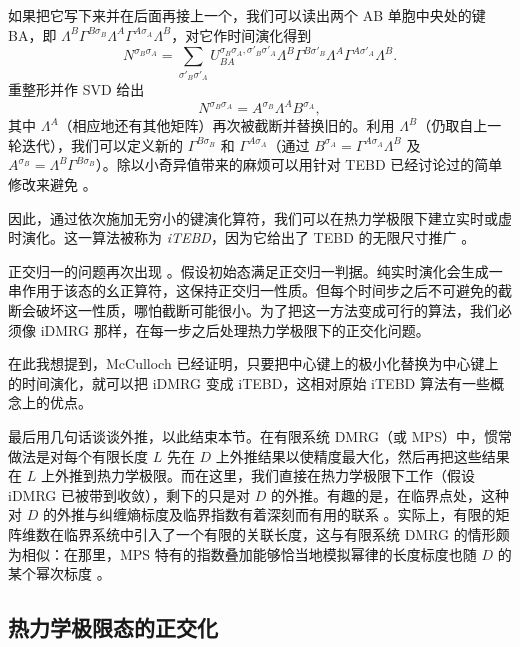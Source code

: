 如果把它写下来并在后面再接上一个，我们可以读出两个 AB 单胞中央处的键 BA，即
$ \Lambda^B \Gamma^{B \sigma_{B}} \Lambda^A \Gamma^{A \sigma_{A}} \Lambda^B$，对它作时间演化得到
\begin{equation}
N^{\sigma_{B}\sigma_{A}} = \sum_{\sigma'_{B}\sigma'_{A}} U_{BA}^ {\sigma_{B}\sigma_{A}, \sigma'_{B}\sigma'_{A}}  \Lambda^B \Gamma^{B \sigma'_{B}} \Lambda^A \Gamma^{A \sigma'_{A}} \Lambda^B .
\end{equation}
重整形并作 SVD 给出
\begin{equation}
N^{\sigma_{B}\sigma_{A}}=A^{\sigma_{B}} \Lambda^A B^{\sigma_{A}} ,
\end{equation}
其中 $\Lambda^A$（相应地还有其他矩阵）再次被截断并替换旧的。利用 $\Lambda^B$（仍取自上一轮迭代），我们可以定义新的 $\Gamma^{B \sigma_{B}}$ 和 $\Gamma^{A \sigma_{A}} $（通过 $B^{\sigma_{A}} =   \Gamma^{A \sigma_{A}} \Lambda^B$ 及 $A^{\sigma_{B}} =\Lambda^B \Gamma^{B \sigma_{B}}$）。除以小奇异值带来的麻烦可以用针对 TEBD 已经讨论过的简单修改来避免 \cite{Hastings09}。

因此，通过依次施加无穷小的键演化算符，我们可以在热力学极限下建立实时或虚时演化。这一算法被称为 {\em iTEBD}，因为它给出了 TEBD 的无限尺寸推广 \cite{Vidal07}。

正交归一的问题再次出现 \cite{Orus08}。假设初始态满足正交归一判据。纯实时演化会生成一串作用于该态的幺正算符，这保持正交归一性质。但每个时间步之后不可避免的截断会破坏这一性质，哪怕截断可能很小。为了把这一方法变成可行的算法，我们必须像 iDMRG 那样，在每一步之后处理热力学极限下的正交化问题。

在此我想提到，McCulloch\cite{McCulloch08} 已经证明，只要把中心键上的极小化替换为中心键上的时间演化，就可以把 iDMRG 变成 iTEBD，这相对原始 iTEBD 算法有一些概念上的优点。

最后用几句话谈谈外推，以此结束本节。在有限系统 DMRG（或 MPS）中，惯常做法是对每个有限长度 $L$ 先在 $D$ 上外推结果以使精度最大化，然后再把这些结果在 $L$ 上外推到热力学极限。而在这里，我们直接在热力学极限下工作（假设 iDMRG 已被带到收敛），剩下的只是对 $D$ 的外推。有趣的是，在临界点处，这种对 $D$ 的外推与纠缠熵标度及临界指数有着深刻而有用的联系 \cite{Tagliacozzo08}。实际上，有限的矩阵维数在临界系统中引入了一个有限的关联长度，这与有限系统 DMRG 的情形颇为相似：在那里，MPS 特有的指数叠加能够恰当地模拟幂律的长度标度也随 $D$ 的某个幂次标度 \cite{Andersson99}。

\subsection{热力学极限态的正交化}

